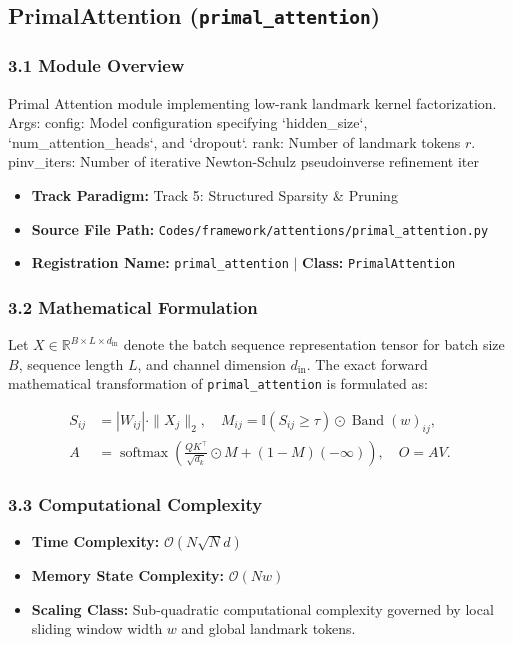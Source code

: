 \subsection{PrimalAttention (\texttt{primal\_attention})}
\label{sec:app_module_primal\_attention}

\subsubsection*{3.1 Module Overview}
Primal Attention module implementing low-rank landmark kernel factorization.  Args:     config: Model configuration specifying `hidden\_size`, `num\_attention\_heads`, and `dropout`.     rank: Number of landmark tokens $r$.     pinv\_iters: Number of iterative Newton-Schulz pseudoinverse refinement iter
\begin{itemize}
    \item \textbf{Track Paradigm:} Track 5: Structured Sparsity & Pruning
    \item \textbf{Source File Path:} \texttt{Codes/framework/attentions/primal\_attention.py}
    \item \textbf{Registration Name:} \texttt{primal\_attention} $\mid$ \textbf{Class:} \texttt{PrimalAttention}
\end{itemize}

\subsubsection*{3.2 Mathematical Formulation}
Let $X \in \mathbb{R}^{B \times L \times d_{\text{in}}}$ denote the batch sequence representation tensor for batch size $B$, sequence length $L$, and channel dimension $d_{\text{in}}$. The exact forward mathematical transformation of \texttt{primal\_attention} is formulated as:

\begin{align}
S_{ij} &= |W_{ij}| \cdot \|X_j\|_2, \quad M_{ij} = \mathbb{I}(S_{ij} \ge \tau) \odot \operatorname{Band}(w)_{ij}, \\
A &= \operatorname{softmax}\left(\frac{Q K^\top}{\sqrt{d_k}} \odot M + (1 - M)(-\infty)\right), \quad O = A V.
\end{align}


\subsubsection*{3.3 Computational Complexity}
\begin{itemize}
    \item \textbf{Time Complexity:} $\mathcal{O}(N \sqrt{N} d)$
    \item \textbf{Memory State Complexity:} $\mathcal{O}(N w)$
    \item \textbf{Scaling Class:} Sub-quadratic computational complexity governed by local sliding window width $w$ and global landmark tokens.
\end{itemize}

